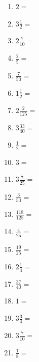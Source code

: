 \documentclass[12pt]{article}
\begin{document}
\begin{enumerate}
\item \large $ 2 = $ \vspace{1.5cm}
\item \large $ 3 \frac{1}{2} = $ \vspace{1.5cm}
\item \large $ 2 \frac{7}{10} = $ \vspace{1.5cm}
\item \large $ \frac{2}{5} = $ \vspace{1.5cm}
\item \large $ \frac{7}{50} = $ \vspace{1.5cm}
\item \large $ 1 \frac{1}{2} = $ \vspace{1.5cm}
\newpage
\item \large $ 2 \frac{2}{125} = $ \vspace{1.5cm}
\item \large $ 3 \frac{33}{40} = $ \vspace{1.5cm}
\item \large $ \frac{1}{2} = $ \vspace{1.5cm}
\item \large $ 3 = $ \vspace{1.5cm}
\item \large $ 3 \frac{7}{25} = $ \vspace{1.5cm}
\item \large $ \frac{3}{50} = $ \vspace{1.5cm}
\item \large $ \frac{118}{125} = $ \vspace{1.5cm}
\item \large $ \frac{4}{25} = $ \vspace{1.5cm}
\item \large $ \frac{19}{25} = $ \vspace{1.5cm}
\item \large $ 2 \frac{1}{4} = $ \vspace{1.5cm}
\newpage
\item \large $ \frac{37}{40} = $ \vspace{1.5cm}
\item \large $ 1 = $ \vspace{1.5cm}
\item \large $ 3 \frac{3}{4} = $ \vspace{1.5cm}
\item \large $ 3 \frac{7}{10} = $ \vspace{1.5cm}
\item \large $ \frac{1}{8} = $ \vspace{1.5cm}

\end{enumerate}
\end{document}
